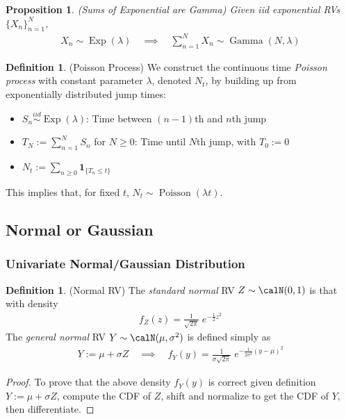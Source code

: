 \documentclass[12pt]{article}
\theoremstyle{plain}
\newtheorem{prop}[thm]{Proposition}
\theoremstyle{definition}
\newtheorem{defn}[thm]{Definition}
\theoremstyle{remark}
\newcommand{\one}[1]{\mathbf{1}_{#1}}
\newcommand{\iid}{\overset{iid}{\sim}}
\newcommand{\sumnN}{\sum^N_{n=1}}
\newcommand{\nN}{_{n=1}^N}
\begin{document}
\begin{prop}\emph{(Sums of Exponential are Gamma)}
Given iid exponential RVs $\{X_n\}\nN$,
\begin{align*}
  X_n \sim \operatorname{Exp}(\lambda)
  \quad\implies\quad
  \sumnN X_n \sim \operatorname{Gamma}(N, \lambda)
\end{align*}
\end{prop}

\begin{defn}(Poisson Process)
We construct the continuous time \emph{Poisson process} with constant
parameter $\lambda$, denoted $N_t$, by building up from exponentially
distributed jump times:
\begin{itemize}
  \item $S_n\iid \operatorname{Exp}(\lambda)$:
    Time between $(n-1)$th and $n$th jump
  \item $T_N:=\sumnN S_n$ for $N\geq 0$:
    Time until $N$th jump, with $T_0:=0$
  \item $N_t:=\sum_{n\geq 0} \one{\{T_n\leq t\}}$
\end{itemize}
This implies that, for fixed $t$,
$N_t\sim\operatorname{Poisson}(\lambda t)$.
\end{defn}


\clearpage
\subsection{Normal or Gaussian}

\subsubsection{Univariate Normal/Gaussian Distribution}

\begin{defn}(Normal RV)
  \label{defn:stdnormal}
The \emph{standard normal} RV $Z\sim \calN(0,1)$ is that with density
\begin{align*}
   f_Z(z)
   = \frac{1}{\sqrt{2\pi}} \; e^{-\frac{1}{2}z^2}
\end{align*}
The \emph{general normal} RV $Y\sim\calN(\mu,\sigma^2)$ is defined
simply as
\begin{align*}
  Y := \mu + \sigma Z
  \quad\implies\quad
   f_Y(y) =
   \frac{1}{\sigma \sqrt{2\pi}}
   \; e^{-\frac{1}{2\sigma^2} (y - \mu)^2}
\end{align*}
\end{defn}
\begin{proof}
To prove that the above density $f_Y(y)$ is correct given definition
$Y:=\mu+\sigma Z$, compute the CDF of $Z$, shift and normalize to get
the CDF of $Y$, then differentiate.
\end{proof}
\end{document}
